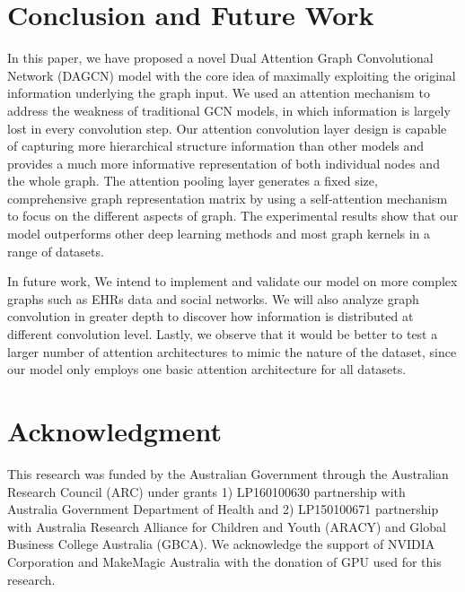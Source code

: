 \documentclass[conference]{IEEEtran}
\begin{document}
	\section{Conclusion and Future Work} In this paper, we have proposed a novel Dual Attention Graph Convolutional Network (DAGCN) model with the core idea of maximally exploiting the original information underlying the graph input. We used an attention mechanism to address the weakness of traditional GCN models, in which information is largely lost in every convolution step. Our attention convolution layer design is capable of capturing more hierarchical structure information than other models and provides a much more informative representation of both individual nodes and the whole graph.  The attention pooling layer generates a fixed size, comprehensive graph representation matrix by using a self-attention mechanism to focus on the different aspects of graph. The experimental results show that our model outperforms other deep learning methods and most graph kernels in a range of datasets.
	
	In future work, We intend to implement and validate our model on more complex graphs such as EHRs data and social networks. We will also analyze graph convolution in greater depth to discover how information is distributed at different convolution level. Lastly, we observe that it would be better to test a larger number of attention architectures to mimic the nature of the dataset, since our model only employs one basic attention architecture for all datasets.
	
	\section*{Acknowledgment}	
 	This research was funded by the Australian Government through the Australian Research Council (ARC) under grants 1) LP160100630 partnership with Australia Government Department of Health and 2) LP150100671 partnership with Australia Research Alliance for Children and Youth (ARACY) and Global Business College Australia (GBCA). We  acknowledge the support of NVIDIA Corporation and MakeMagic Australia with the donation of GPU used for this research.

\balance

	
	
	
\end{document}

